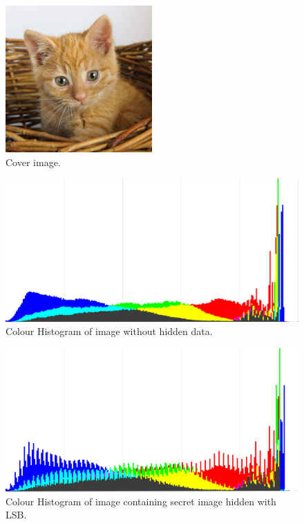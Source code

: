 \begin{figure}
	\centering
	\includegraphics[width=0.5\textwidth]{figures/cover.jpg}
	\caption{Cover image.}
	\label{fig:CoverImage}
\end{figure}

\begin{figure}
	\centering
	\includegraphics[width=1\textwidth]{figures/HistoLSBCat.png}
	\caption{Colour Histogram of image without hidden data.}
	\label{fig:HistoWithoutLSB}
\end{figure}

\begin{figure}
	\centering
	\includegraphics[width=1\textwidth]{figures/HistoLSBCatEncrypted.png}
	\caption{Colour Histogram of image containing secret image hidden with LSB.}
	\label{fig:HistoWithLSB}
\end{figure}

